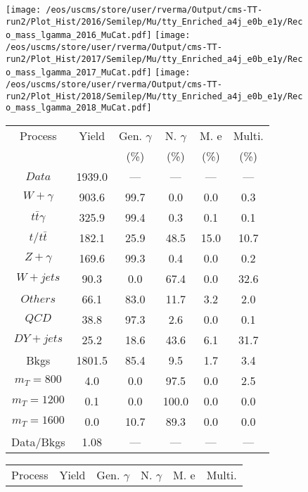 \begin{figure}
\centering
\texttt{[image: /eos/uscms/store/user/rverma/Output/cms-TT-run2/Plot\_Hist/2016/Semilep/Mu/tty\_Enriched\_a4j\_e0b\_e1y/Reco\_mass\_lgamma\_2016\_MuCat.pdf]}
\texttt{[image: /eos/uscms/store/user/rverma/Output/cms-TT-run2/Plot\_Hist/2017/Semilep/Mu/tty\_Enriched\_a4j\_e0b\_e1y/Reco\_mass\_lgamma\_2017\_MuCat.pdf]}
\texttt{[image: /eos/uscms/store/user/rverma/Output/cms-TT-run2/Plot\_Hist/2018/Semilep/Mu/tty\_Enriched\_a4j\_e0b\_e1y/Reco\_mass\_lgamma\_2018\_MuCat.pdf]}
\begin{minipage}[c]{0.32\textwidth}
\centering
\tiny{
\begin{tabular}{cccccc}
\hline
Process & Yield & Gen. $\gamma$ & N. $\gamma$ & M. e & Multi. \\
 &  & (\%) & (\%) & (\%) & (\%)  \\
\hline
                                                                      $ Data $ &  1939.0 &  --- &  --- &  --- &  ---\\
$ W+\gamma $ &  903.6 &  99.7 &  0.0 &  0.0 &  0.3\\
$ t\bar{t}\gamma $ &  325.9 &  99.4 &  0.3 &  0.1 &  0.1\\
$ t/t\bar{t} $ &  182.1 &  25.9 &  48.5 &  15.0 &  10.7\\
$ Z+\gamma $ &  169.6 &  99.3 &  0.4 &  0.0 &  0.2\\
$ W+jets $ &  90.3 &  0.0 &  67.4 &  0.0 &  32.6\\
$ Others $ &  66.1 &  83.0 &  11.7 &  3.2 &  2.0\\
$ QCD $ &  38.8 &  97.3 &  2.6 &  0.0 &  0.1\\
$ DY+jets $ &  25.2 &  18.6 &  43.6 &  6.1 &  31.7\\
Bkgs &  1801.5 &  85.4 &  9.5 &  1.7 &  3.4\\
$ m_{T} = 800 $ &  4.0 &  0.0 &  97.5 &  0.0 &  2.5\\
$ m_{T} = 1200 $ &  0.1 &  0.0 &  100.0 &  0.0 &  0.0\\
$ m_{T} = 1600 $ &  0.0 &  10.7 &  89.3 &  0.0 &  0.0\\
Data/Bkgs &  1.08 &  --- &  --- &  --- &  ---\\
\hline
\end{tabular}
}
\end{minipage}
\begin{minipage}[c]{0.32\textwidth}
\centering
\tiny{
\begin{tabular}{cccccc}
\hline
Process & Yield & Gen. $\gamma$ & N. $\gamma$ & M. e & Multi. \\

\end{tabular}}
\end{minipage}
\end{figure}

